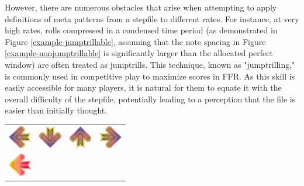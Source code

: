 However, there are numerous obstacles that arise when attempting to apply definitions of meta patterns from a stepfile to different rates. For instance, at very high rates, rolls compressed in a condensed time period (as demonstrated in Figure \ref{example-jumptrillable}, assuming that the note spacing in Figure  \ref{example-nonjumptrillable} is significantly larger than the allocated perfect window) are often treated as jumptrills. This technique, known as "jumptrilling," is commonly used in competitive play to maximize scores in FFR. As this skill is easily accessible for many players, it is natural for them to equate it with the overall difficulty of the stepfile, potentially leading to a perception that the file is easier than initially thought.


\begin{center}
	\begin{table}[ht]
		\begin{minipage}{.5\linewidth}
			\centering
			\begin{tabular}[b]{cccc}
				\includegraphics[width=1cm]{figures/receptor/left.png}
				  & \includegraphics[width=1cm]{figures/receptor/down.png}  
				  & \includegraphics[width=1cm]{figures/receptor/up.png}    
				  & \includegraphics[width=1cm]{figures/receptor/right.png} 
				\\
				\includegraphics[width=1cm]{figures/004/left.png}
				  &                                                         
				  &                                                         
				  &                                                         
				\\
				[-20pt]
				

\end{tabular}
\end{minipage}
\end{table}
\end{center}

